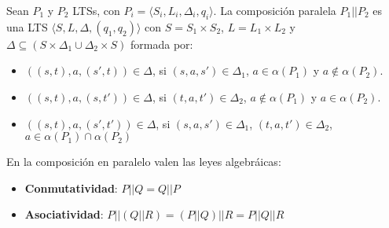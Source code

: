 \begin{definicion}
 Sean $P_1$ y $P_2$ LTSs, con $P_i = \langle S_i, L_i, \Delta_i, q_i\rangle$. La composici\'on paralela $P_1||P_2$ es una LTS $\langle S, L,\Delta, (q_1,q_2) \rangle$ con $S = S_1 \times S_2$, $L = L_1 \times L_2$ y $\Delta \subseteq (S \times \Delta_1 \cup \Delta_2 \times S)$ formada por:
 
 \begin{itemize}
  \item $((s,t),a,(s',t)) \in \Delta$, si $(s,a,s')\in\Delta_1$, $a\in\alpha(P_1)$ y $a\notin\alpha(P_2)$.
  
  \item $((s,t),a,(s,t')) \in \Delta$, si $(t,a,t')\in\Delta_2$, $a\notin\alpha(P_1)$ y $a\in\alpha(P_2)$.
  
  \item $((s,t),a,(s',t')) \in \Delta$, si $(s,a,s')\in\Delta_1$, $(t,a,t')\in\Delta_2$, $a\in\alpha(P_1)\cap\alpha(P_2)$
 \end{itemize}

 

\end{definicion}

\begin{propiedad}

En la composici\'on en paralelo valen las leyes algebr\'aicas:
 \begin{itemize}
  \item \textbf{Conmutatividad}: $P || Q = Q || P$
  \item \textbf{Asociatividad}: $P||(Q||R) = (P||Q)||R = P||Q||R $
 \end{itemize}

\end{propiedad}
